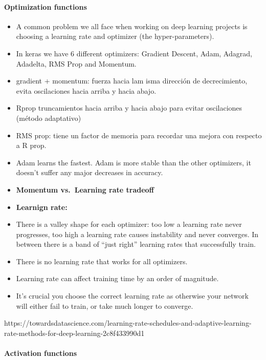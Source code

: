 \documentclass[11pt]{article}
\begin{document}
\hypertarget{optimization-functions}{%
\paragraph{Optimization functions}\label{optimization-functions}}

\begin{itemize}
\item
  A common problem we all face when working on deep learning projects is
  choosing a learning rate and optimizer (the hyper-parameters).
\item
  In keras we have 6 different optimizers: Gradient Descent, Adam,
  Adagrad, Adadelta, RMS Prop and Momentum.
\item
  gradient + momentum: fuerza hacia lam isma dirección de decrecimiento,
  evita oscilaciones hacia arriba y hacia abajo.
\item
  Rprop truncamientos hacia arriba y hacia abajo para evitar
  oscilaciones (método adaptativo)
\item
  RMS prop: tiene un factor de memoria para recordar una mejora con
  respecto a R prop.
\item
  Adam learns the fastest. Adam is more stable than the other
  optimizers, it doesn't suffer any major decreases in accuracy.
\item
  \textbf{Momentum vs.~Learning rate tradeoff}
\item
  \textbf{Learnign rate:}
\item
  There is a valley shape for each optimizer: too low a learning rate
  never progresses, too high a learning rate causes instability and
  never converges. In between there is a band of ``just right'' learning
  rates that successfully train.
\item
  There is no learning rate that works for all optimizers.
\item
  Learning rate can affect training time by an order of magnitude.
\item
  It's crucial you choose the correct learning rate as otherwise your
  network will either fail to train, or take much longer to converge.
\end{itemize}

https://towardsdatascience.com/learning-rate-schedules-and-adaptive-learning-rate-methods-for-deep-learning-2c8f433990d1

\hypertarget{activation-functions}{%
\paragraph{Activation functions}\label{activation-functions}}
\end{document}
